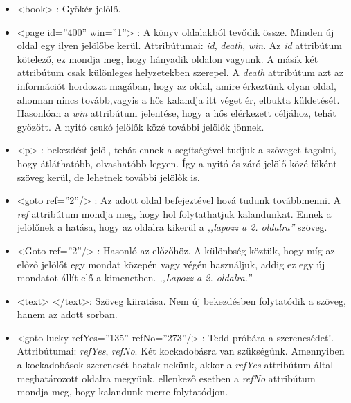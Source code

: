 \documentclass[12pt,a4paper,oneside]{report}
\newcommand{\attr}{\emph}
\begin{document}
    \begin{itemize}
      \item <{\color{Tag}book}> : Gyökér jelölő.

      \item <{\color{Tag}page} {\color{Attr}id}={\color{Value}''400''}
        {\color{Attr}win}={\color{Value}''1''}> : A könyv oldalakból
        tevődik össze. Minden új oldal egy ilyen jelölőbe
        kerül. Attribútumai: \attr{id}, \attr{death}, \attr{win}.  Az
        \attr{id} attribútum kötelező, ez mondja meg, hogy hányadik
        oldalon vagyunk. A másik két attribútum csak különleges
        helyzetekben szerepel. A \attr{death} attribútum azt az
        információt hordozza magában, hogy az oldal, amire érkeztünk
        olyan oldal, ahonnan nincs tovább,vagyis a hős kalandja itt
        véget ér, elbukta küldetését. Hasonlóan a \attr{win}
        attribútum jelentése, hogy a hős elérkezett céljához, tehát
        győzött. A nyitó csukó jelölők közé további jelölők jönnek.
    
      \item <{\color{Tag}p}> : bekezdést jelöl, tehát ennek a
        segítségével tudjuk a szöveget tagolni, hogy átláthatóbb,
        olvashatóbb legyen. Így a nyitó és záró jelölő közé főként
        szöveg kerül, de lehetnek további jelölők is.
        
      \item <{\color{Tag}goto}
        {\color{Attr}ref}={\color{Value}''2''}/> : Az adott oldal
        befejeztével hová tudunk továbbmenni. A \attr{ref} attribútum
        mondja meg, hogy hol folytathatjuk kalandunkat. Ennek a
        jelölőnek a hatása, hogy az oldalra kikerül a \emph{,,lapozz a
          2. oldalra''} szöveg.
    
      \item <{\color{Tag}Goto}
        {\color{Attr}ref}={\color{Value}''2''}/> : Hasonló az
        előzőhöz. A különbség köztük, hogy míg az előző jelölőt egy
        mondat közepén vagy végén használjuk, addig ez egy új mondatot
        állít elő a kimenetben. \emph{,,Lapozz a 2. oldalra.''}
    
      \item <{\color{Tag}text}> <{\color{Tag}/text}>: Szöveg
        kiiratása. Nem új bekezdésben folytatódik a szöveg, hanem az
        adott sorban.
    
      \item <{\color{Tag}goto-lucky}
        {\color{Attr}refYes}={\color{Value}''135''}
        {\color{Attr}refNo}={\color{Value}''273''}/> : Tedd próbára a
        szerencsédet!. Attribútumai: \attr{refYes}, \attr{refNo}. Két
        kockadobásra van szükségünk. Amennyiben a kockadobások
        szerencsét hoztak nekünk, akkor a \attr{refYes} attribútum
        által meghatározott oldalra megyünk, ellenkező esetben a
        \attr{refNo} attribútum mondja meg, hogy kalandunk merre
        folytatódjon.
    

\end{itemize}
\end{document}
